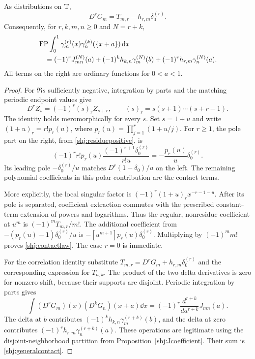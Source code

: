 \begin{theorem}\label{shj:contactthm}
As distributions on $\mathbb T$,
\begin{equation}\label{shj:contactlaw}
\boxed{D^rG_m=T_{m,r}-h_{r,m}\delta_0^{(r)}.}
\end{equation}
Consequently, for $r,k,m,n\ge0$ and $N=r+k$,
\begin{align}
&\operatorname{FP}\int_0^1\gamma_m^{(r)}(x)\gamma_n^{(k)}(\{x+a\})\,\mathrm{d} x\notag\\
&\quad=(-1)^r J_{mn}^{(N)}(a)
+(-1)^k h_{k,n}\gamma_m^{(N)}(b)
+(-1)^r h_{r,m}\gamma_n^{(N)}(a).
\label{shj:generalcontact}
\end{align}
All terms on the right are ordinary functions for $0<a<1$.
\end{theorem}
\begin{proof}
For $\Re s$ sufficiently negative, integration by parts and the matching periodic endpoint values give
\[
D^rZ_s=(-1)^r(s)_rZ_{s+r},
\qquad (s)_r=s(s+1)\cdots(s+r-1).
\]
The identity holds meromorphically for every $s$. Set $s=1+u$ and write
$(1+u)_r=r!p_r(u)$, where $p_r(u)=\prod_{j=1}^r(1+u/j)$.
For $r\ge1$, the pole part on the right, from \eqref{shj:residuepositive}, is
\[
(-1)^r r!p_r(u)\frac{(-1)^{r+1}\delta_0^{(r)}}{r!u}
=-\frac{p_r(u)}u\delta_0^{(r)}.
\]
Its leading pole $-\delta_0^{(r)}/u$ matches $D^r(1-\delta_0)/u$ on the left. The remaining polynomial coefficients in this polar contribution are the contact terms.

More explicitly, the local singular factor is
$(-1)^r(1+u)_r x^{-r-1-u}$. After its pole is separated, coefficient extraction commutes with the prescribed constant-term extension of powers and logarithms. Thus the regular, nonresidue coefficient at $u^m$ is $(-1)^mT_{m,r}/m!$. The additional coefficient from $-(p_r(u)-1)\delta_0^{(r)}/u$ is $-[u^{m+1}]p_r(u)\delta_0^{(r)}$. Multiplying by $(-1)^m m!$ proves \eqref{shj:contactlaw}. The case $r=0$ is immediate.

For the correlation identity substitute
$T_{m,r}=D^rG_m+h_{r,m}\delta_0^{(r)}$ and the corresponding expression for $T_{n,k}$. The product of the two delta derivatives is zero for nonzero shift, because their supports are disjoint. Periodic integration by parts gives
\[
\int (D^rG_m)(x)(D^kG_n)(x+a)\dd x
=(-1)^r\frac{d^{r+k}}{da^{r+k}}J_{mn}(a).
\]
The delta at $b$ contributes $(-1)^k h_{k,n}\gamma_m^{(r+k)}(b)$, and the delta at zero contributes $(-1)^r h_{r,m}\gamma_n^{(r+k)}(a)$. These operations are legitimate using the disjoint-neighborhood partition from Proposition~\ref{shj:Jcoefficient}. Their sum is \eqref{shj:generalcontact}.
\end{proof}


